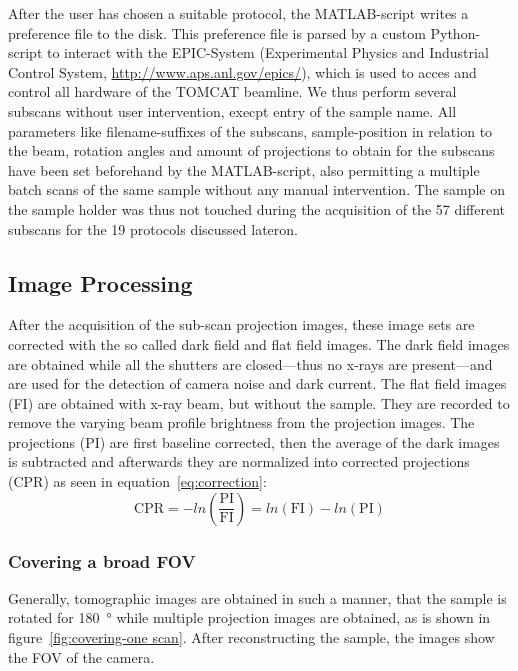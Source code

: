After the user has chosen a suitable protocol, the MATLAB-script writes a preference file to the disk. This preference file is parsed by a custom Python-script to interact with the EPIC-System (Experimental Physics and Industrial Control System, \url{http://www.aps.anl.gov/epics/}), which is used to acces and control all hardware of the TOMCAT beamline. We thus perform several subscans without user intervention, execpt entry of the sample name. All parameters like filename-suffixes of the subscans, sample-position in relation to the beam, rotation angles and amount of projections to obtain for the subscans have been set beforehand by the MATLAB-script, also permitting a multiple batch scans of the same sample without any manual intervention. The sample on the sample holder was thus not touched during the acquisition of the 57 different subscans for the 19 protocols discussed lateron. 

\subsection{Image Processing}
\label{subsec:image processing}
After the acquisition of the sub-scan projection images, these image sets are corrected with the so called dark field and flat field images. The dark field images are obtained while all the shutters are closed---thus no x-rays are present---and are used for the detection of camera noise and dark current. The flat field images (FI) are obtained with x-ray beam, but without the sample. They are recorded to remove the varying beam profile brightness from the projection images. The projections (PI) are first baseline corrected, then the average of the dark images is subtracted and afterwards they are normalized into corrected projections (CPR) as seen in equation~\ref{eq:correction}:%
\begin{equation}
	\text{CPR}=-ln\left(\frac{\text{PI}}{\text{FI}}\right)=ln(\text{FI})-ln(\text{PI})
	\label{eq:correction}
\end{equation}

\subsubsection{Covering a broad FOV}
\label{subsec:covering a broad fov}
Generally, tomographic images are obtained in such a manner, that the sample is rotated for \SI{180}{\degree} while multiple projection images are obtained, as is shown in figure~\ref{fig:covering-one scan}. After reconstructing the sample, the images show the FOV of the camera.

